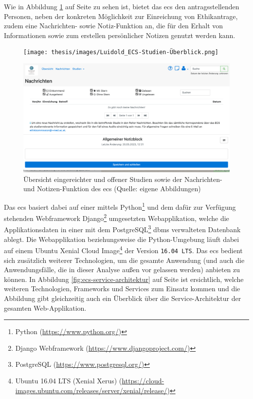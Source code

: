 \documentclass[a4paper,12pt,twoside]{scrreprt}
\begin{document}
Wie in Abbildung \ref{fig:ecs-studien-nachrichten-notizen} auf Seite \pageref{fig:ecs-studien-nachrichten-notizen} zu sehen ist, bietet das \ac{ecs} den antragsstellenden Personen, neben der konkreten Möglichkeit zur Einreichung von Ethikantrage, zudem eine Nachrichten- sowie Notiz-Funktion an, die für den Erhalt von Informationen sowie zum erstellen persönlicher Notizen genutzt werden kann.

\begin{figure}[ht!]
    \centering
    \begin{minipage}[t]{.85\linewidth}
        \texttt{[image: thesis/images/Luidold\_ECS-Studien-Überblick.png]}
    \end{minipage}
    \begin{minipage}[b]{.85\linewidth}
        \includegraphics[width=\linewidth]{thesis/images/Luidold_ECS-Nachrichten-Notizen.png}
    \end{minipage}
    \caption[Übersicht eingereichter und offener Studien (oben) sowie der Nachrichten- und Notizen-Funktion (unten) des \acl{ecs}]{Übersicht eingereichter und offener Studien sowie der Nachrichten- und Notizen-Funktion des \acl{ecs} (Quelle: eigene Abbildungen)}
    \label{fig:ecs-studien-nachrichten-notizen}
\end{figure}

Das \acl{ecs} basiert dabei auf einer mittels Python\footnote{Python (\url{https://www.python.org/})} und dem dafür zur Verfügung stehenden Webframework Django\footnote{Django Webframework (\url{https://www.djangoproject.com/})} umgesetzten Webapplikation, welche die Applikationsdaten in einer mit dem PostgreSQL\footnote{PostgreSQL (\url{https://www.postgresql.org/)}} \ac{dbms} verwalteten Datenbank ablegt. Die Webapplikation beziehungsweise die Python-Umgebung läuft dabei auf einem Ubuntu Xenial Cloud Image\footnote{Ubuntu 16.04 LTS (Xenial Xerus) (\url{https://cloud-images.ubuntu.com/releases/server/xenial/release/})} der Version \texttt{16.04 LTS}. Das \ac{ecs} bedient sich zusätzlich weiterer Technologien, um die gesamte Anwendung (und auch die Anwendungsfälle, die in dieser Analyse außen vor gelassen werden) anbieten zu können. In Abbildung \ref{fig:ecs-service-architektur} auf Seite \pageref{fig:ecs-service-architektur} ist ersichtlich, welche weiteren Technologien, Frameworks und Services zum Einsatz kommen und die Abbildung gibt gleichzeitig auch ein Überblick über die Service-Architektur der gesamten Web-Applikation. \cite{medizinische_universitat_wien_ecs_2021-1, medizinische_universitat_wien_ecs_2021}
\end{document}
